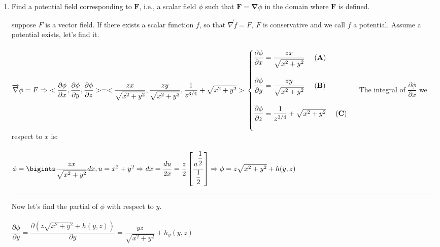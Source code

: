 \documentclass[fleqn]{article}
\begin{document}
\begin{enumerate}
\begin{enumerate}
        \item Find a potential field corresponding to $\mathbf{F}$, i.e., a scalar field $\phi$ such that $\mathbf{F}=\mathbf{\nabla}\phi$ in the domain where $\mathbf{F}$ is defined.

          \textcolor{hwColor}{
            suppose $F$ is a vector field. If there exists a scalar function $f$, so that $\overrightarrow{\nabla}f=F, ~ F$ is 
            conservative and we call $f$ a potential. Assume a potential exists, let's find it. \\ \\
            $
              \overrightarrow{\nabla} \phi=F \Rightarrow ~ <\dfrac{\partial \phi}{\partial x}, \dfrac{\partial \phi}{\partial y}, \dfrac{\partial \phi}{\partial z}>=<\dfrac{zx}{\sqrt{x^2+y^2}}, \dfrac{zy}{\sqrt{x^2+y^2}}, \dfrac{1}{z^{3/4}}+\sqrt{x^2+y^2}> \\ 
              \\
              \begin{cases}
                \dfrac{\partial \phi}{\partial x}=\dfrac{zx}{\sqrt{x^2+y^2}} ~~~~ \mathbf{(A)}\\
                \\
                \dfrac{\partial \phi}{\partial y}=\dfrac{zy}{\sqrt{x^2+y^2}} ~~~~ \mathbf{(B)}\\
                \\
                \dfrac{\partial \phi}{\partial z}=\dfrac{1}{z^{3/4}}+\sqrt{x^2+y^2} ~~~~ \mathbf{(C)}\\ \\
              \end{cases} \\
            $
            The integral of $\dfrac{\partial \phi}{\partial x}$ we respect to $x$ is: \\ \\
            $
              \phi=\bigints \dfrac{zx}{\sqrt{x^2+y^2}} dx, u=x^2+y^2 \Rightarrow dx=\dfrac{du}{2x} \\
              \\
              =\dfrac{z}{2} \left[\dfrac{u^{\dfrac{1}{2}}}{\dfrac{1}{2}}\right] \Rightarrow \phi=z\sqrt{x^2+y^2}+h(y,z) \\ \\
            $
            \rule{15cm}{1pt}
            Now let's find the partial of $\phi$ with respect to $y$. \\
            \\
            $\dfrac{\partial \phi}{\partial y}=\dfrac{\partial (z\sqrt{x^2+y^2}+h(y,z))}{\partial y}=\dfrac{yz}{\sqrt{x^2+y^2}}+h_y(y,z)$ \\ \\
}
\end{enumerate}
\end{enumerate}
\end{document}
